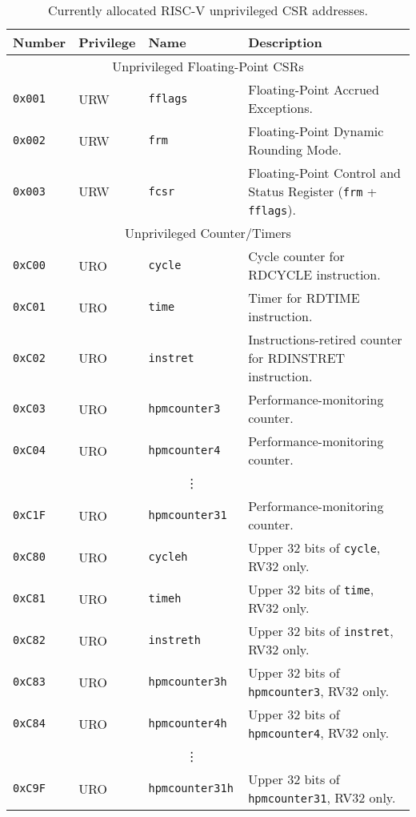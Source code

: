 \begin{table}[htb!]
\begin{center}
\begin{tabular}{|l|l|l|l|}
\hline
Number    & Privilege & Name & Description \\
\hline
\multicolumn{4}{|c|}{Unprivileged Floating-Point CSRs} \\
\hline
\tt 0x001 & URW  &\tt fflags     & Floating-Point Accrued Exceptions. \\
\tt 0x002 & URW  &\tt frm        & Floating-Point Dynamic Rounding Mode. \\
\tt 0x003 & URW  &\tt fcsr       & Floating-Point Control and Status
Register ({\tt frm} + {\tt fflags}). \\
\hline
\multicolumn{4}{|c|}{Unprivileged Counter/Timers} \\
\hline
\tt 0xC00 & URO  &\tt cycle         & Cycle counter for RDCYCLE instruction. \\
\tt 0xC01 & URO  &\tt time          & Timer for RDTIME instruction. \\
\tt 0xC02 & URO  &\tt instret       & Instructions-retired counter for RDINSTRET instruction. \\
\tt 0xC03 & URO  &\tt hpmcounter3   & Performance-monitoring counter. \\
\tt 0xC04 & URO  &\tt hpmcounter4   & Performance-monitoring counter. \\
& & \multicolumn{1}{c|}{\vdots} & \ \\
\tt 0xC1F & URO  &\tt hpmcounter31  & Performance-monitoring counter. \\
\tt 0xC80 & URO  &\tt cycleh        & Upper 32 bits of {\tt cycle}, RV32 only. \\
\tt 0xC81 & URO  &\tt timeh         & Upper 32 bits of {\tt time}, RV32 only. \\
\tt 0xC82 & URO  &\tt instreth      & Upper 32 bits of {\tt instret}, RV32 only. \\
\tt 0xC83 & URO  &\tt hpmcounter3h  & Upper 32 bits of {\tt hpmcounter3}, RV32 only. \\
\tt 0xC84 & URO  &\tt hpmcounter4h  & Upper 32 bits of {\tt hpmcounter4}, RV32 only. \\
& & \multicolumn{1}{c|}{\vdots} & \ \\
\tt 0xC9F & URO  &\tt hpmcounter31h & Upper 32 bits of {\tt hpmcounter31}, RV32 only. \\
\hline
\end{tabular}
\end{center}
\caption{Currently allocated RISC-V unprivileged CSR addresses.}
\label{ucsrnames}
\end{table}

